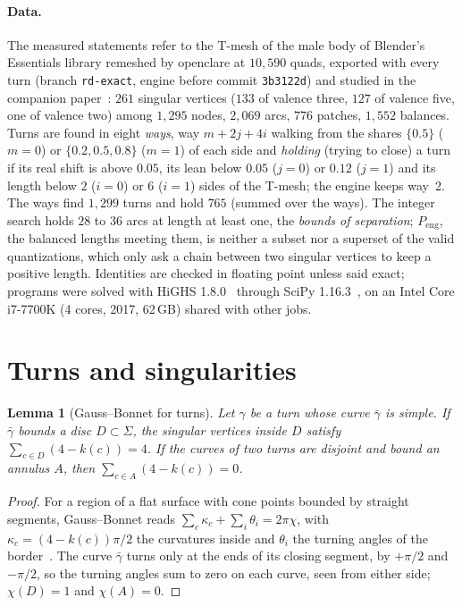 \documentclass[11pt,a4paper]{article}
\newtheorem{lemma}{Lemma}
\begin{document}
\paragraph{Data.}
The measured statements refer to the T-mesh of the male body of Blender's
Essentials library remeshed by openclare at $10{,}590$ quads, exported with
every turn (branch \texttt{rd-exact}, engine before commit \texttt{3b3122d})
and studied in the companion paper~\cite[\S7]{gardent2026loops}: $261$
singular vertices ($133$ of valence three, $127$ of valence five, one of
valence two) among $1{,}295$ nodes, $2{,}069$ arcs, $776$ patches, $1{,}552$
balances. Turns are found in eight \emph{ways}, way $m + 2j + 4i$ walking from
the shares $\{0.5\}$ ($m = 0$) or $\{0.2, 0.5, 0.8\}$ ($m = 1$) of each side
and \emph{holding} (trying to close) a turn if its real shift is above $0.05$,
its lean below $0.05$ ($j = 0$) or $0.12$ ($j = 1$) and its length below $2$
($i = 0$) or $6$ ($i = 1$) sides of the T-mesh; the engine keeps way~2. The
ways find $1{,}299$ turns and hold $765$ (summed over the ways). The integer
search holds $28$ to $36$ arcs at length at least one, the \emph{bounds of
separation}; $P_{\mathrm{eng}}$, the
balanced lengths meeting them, is neither a subset nor a superset of the valid
quantizations, which only ask a chain between two singular vertices to keep a
positive length. Identities are checked in floating point unless said exact;
programs were solved with HiGHS 1.8.0~\cite{huangfu2018highs} through SciPy
1.16.3~\cite{virtanen2020scipy}, on an Intel Core i7-7700K (4 cores, 2017,
62\,GB) shared with other jobs.

\section{Turns and singularities}\label{sec:holonomy}

\begin{lemma}[Gauss--Bonnet for turns]\label{lem:gauss}
Let $\gamma$ be a turn whose curve $\bar\gamma$ is simple. If $\bar\gamma$
bounds a disc $D \subset \Sigma$, the singular vertices inside $D$ satisfy
$\sum_{c \in D} (4 - k(c)) = 4$. If the curves of two turns are disjoint and
bound an annulus $A$, then $\sum_{c \in A} (4 - k(c)) = 0$.
\end{lemma}

\begin{proof}
For a region of a flat surface with cone points bounded by straight segments,
Gauss--Bonnet reads $\sum_c \kappa_c + \sum_i \theta_i = 2\pi\chi$, with
$\kappa_c = (4 - k(c))\pi/2$ the curvatures inside and $\theta_i$ the turning
angles of the border~\cite{bommes2013survey}. The curve $\bar\gamma$ turns
only at the ends of its closing segment, by $+\pi/2$ and $-\pi/2$, so the
turning angles sum to zero on each curve, seen from either side; $\chi(D) = 1$
and $\chi(A) = 0$.
\end{proof}
\end{document}

